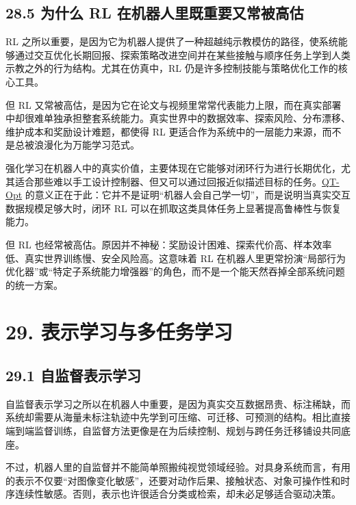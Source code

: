 \subsection*{28.5 为什么 RL 在机器人里既重要又常被高估}


RL 之所以重要，是因为它为机器人提供了一种超越纯示教模仿的路径，使系统能够通过交互优化长期回报、探索策略改进空间并在某些接触与顺序任务上学到人类示教之外的行为结构。尤其在仿真中，RL 仍是许多控制技能与策略优化工作的核心工具。

但 RL 又常被高估，是因为它在论文与视频里常常代表能力上限，而在真实部署中却很难单独承担整套系统能力。真实世界中的数据效率、探索风险、分布漂移、维护成本和奖励设计难题，都使得 RL 更适合作为系统中的一层能力来源，而不是总被浪漫化为万能学习范式。

强化学习在机器人中的真实价值，主要体现在它能够对闭环行为进行长期优化，尤其适合那些难以手工设计控制器、但又可以通过回报近似描述目标的任务。\href{https://arxiv.org/abs/1806.10293}{QT-Opt} 的意义正在于此：它并不是证明“机器人会自己学一切”，而是说明当真实交互数据规模足够大时，闭环 RL 可以在抓取这类具体任务上显著提高鲁棒性与恢复能力。

但 RL 也经常被高估。原因并不神秘：奖励设计困难、探索代价高、样本效率低、真实世界训练慢、安全风险高。这意味着 RL 在机器人里更常扮演“局部行为优化器”或“特定子系统能力增强器”的角色，而不是一个能天然吞掉全部系统问题的统一方案。

\section*{29. 表示学习与多任务学习}

\subsection*{29.1 自监督表示学习}


自监督表示学习之所以在机器人中重要，是因为真实交互数据昂贵、标注稀缺，而系统却需要从海量未标注轨迹中先学到可压缩、可迁移、可预测的结构。相比直接端到端监督训练，自监督方法更像是在为后续控制、规划与跨任务迁移铺设共同底座。

不过，机器人里的自监督并不能简单照搬纯视觉领域经验。对具身系统而言，有用的表示不仅要“对图像变化敏感”，还要对动作后果、接触状态、对象可操作性和时序连续性敏感。否则，表示也许很适合分类或检索，却未必足够适合驱动决策。

